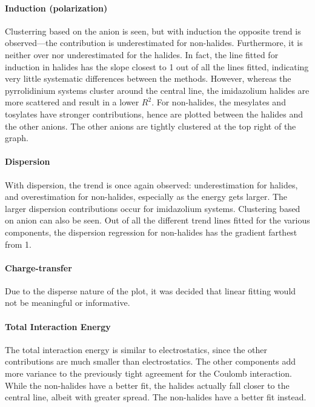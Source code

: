 \paragraph{Induction (polarization)}
Clusterring based on the anion is seen, but with induction the opposite trend is observed---the contribution is underestimated for non-halides.
Furthermore, it is neither over nor underestimated for the halides.
In fact, the line fitted for induction in halides has the slope closest to 1 out of all the lines fitted, indicating very little systematic differences between the methods.
However, whereas the pyrrolidinium systems cluster around the central line, the imidazolium halides are more scattered and result in a lower $R^2$.
For non-halides, the mesylates and tosylates have stronger contributions, hence are plotted between the halides and the other anions. 
The other anions are tightly clustered at the top right of the graph.

\paragraph{Dispersion}
With dispersion, the trend is once again observed: underestimation for halides, and overestimation for non-halides, especially as the energy gets larger.
The larger dispersion contributions occur for imidazolium systems.
Clustering based on anion can also be seen.
Out of all the different trend lines fitted for the various components, the dispersion regression for non-halides has the gradient farthest from 1. 

\paragraph{Charge-transfer}
Due to the disperse nature of the plot, it was decided that linear fitting would not be meaningful or informative.

\paragraph{Total Interaction Energy}
The total interaction energy is similar to electrostatics, since the other contributions are much smaller than electrostatics.
The other components add more variance to the previously tight agreement for the Coulomb interaction.
While the non-halides have a better fit, the halides actually fall closer to the central line, albeit with greater spread.
The non-halides have a better fit instead. 

